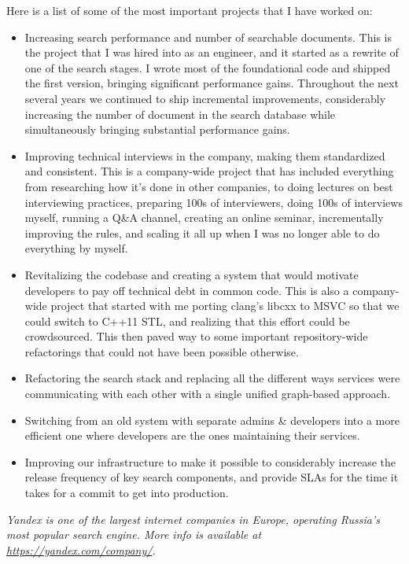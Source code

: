 \documentclass[margin,line]{CV}
\begin{document}
\begin{resume}
    Here is a list of some of the most important projects that I have worked on:
    
    \begin{itemize}
    \item Increasing search performance and number of searchable documents. This is the project that I was hired into as an engineer, and it started as a rewrite of one of the search stages. I wrote most of the foundational code and shipped the first version, bringing significant performance gains. Throughout the next several years we continued to ship incremental improvements, considerably increasing the number of document in the search database while simultaneously bringing substantial performance gains.
    \item Improving technical interviews in the company, making them standardized and consistent. This is a company-wide project that has included everything from researching how it's done in other companies, to doing lectures on best interviewing practices, preparing 100s of interviewers, doing 100s of interviews myself, running a Q\&A channel, creating an online seminar, incrementally improving the rules, and scaling it all up when I was no longer able to do everything by myself.
    \item Revitalizing the codebase and creating a system that would motivate developers to pay off technical debt in common code. This is also a company-wide project that started with me porting clang's libcxx to MSVC so that we could switch to C++11 STL, and realizing that this effort could be crowdsourced. This then paved way to some important repository-wide refactorings that could not have been possible otherwise.
    \item Refactoring the search stack and replacing all the different ways services were communicating with each other with a single unified graph-based approach.
    \item Switching from an old system with separate admins \& developers into a more efficient one where developers are the ones maintaining their services.
    \item Improving our infrastructure to make it possible to considerably increase the release frequency of key search components, and provide SLAs for the time it takes for a commit to get into production.
    \end{itemize}

\ifdefined\superofficial
    {\footnotesize\textit{Yandex is one of the largest internet companies in Europe, operating Russia's most popular search engine. More info is available at \url{https://yandex.com/company/}.}}
\fi 


\end{resume}
\end{document}

